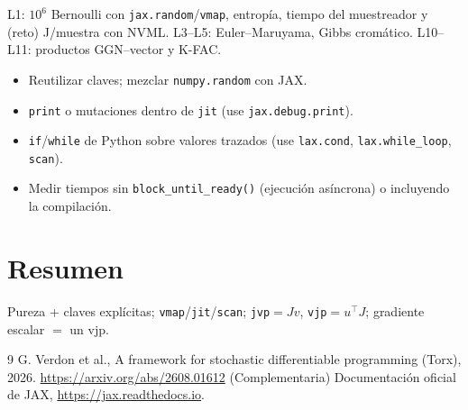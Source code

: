 \documentclass[11pt,a4paper]{article}
\begin{document}
\begin{aplicacion}
L1: $10^6$ Bernoulli con \texttt{jax.random}/\texttt{vmap}, entropía, tiempo del muestreador y (reto) J/muestra
con NVML. L3--L5: Euler--Maruyama, Gibbs cromático. L10--L11: productos GGN--vector y K-FAC.
\end{aplicacion}

\begin{error}
\begin{itemize}[nosep]
\item Reutilizar claves; mezclar \texttt{numpy.random} con JAX.
\item \texttt{print} o mutaciones dentro de \texttt{jit} (use \texttt{jax.debug.print}).
\item \texttt{if}/\texttt{while} de Python sobre valores trazados (use \texttt{lax.cond}, \texttt{lax.while\_loop}, \texttt{scan}).
\item Medir tiempos sin \texttt{block\_until\_ready()} (ejecución asíncrona) o incluyendo la compilación.
\end{itemize}
\end{error}

\section{Resumen}
Pureza + claves explícitas; \texttt{vmap}/\texttt{jit}/\texttt{scan}; \texttt{jvp}$=Jv$, \texttt{vjp}$=u^\top J$; gradiente escalar $=$ un vjp.

\begin{thebibliography}{9}\small
{} G. Verdon et al., A framework for stochastic differentiable programming (Torx), 2026. \url{https://arxiv.org/abs/2608.01612}
 (Complementaria) Documentación oficial de JAX, \url{https://jax.readthedocs.io}.
\end{thebibliography}
\end{document}

